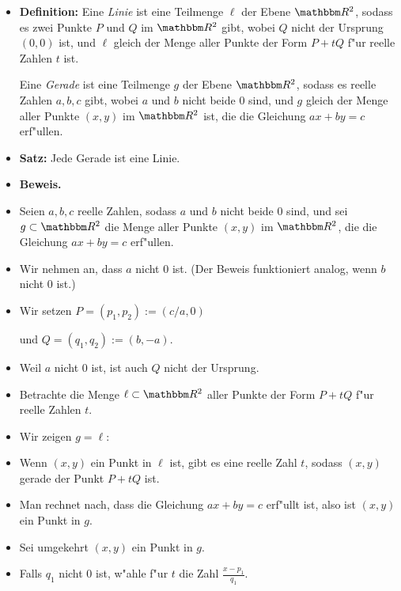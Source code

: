 \documentclass[a4paper%
]{report}
\begin{document}
\newpage

\begin{itemize}[\mbox{}]
\item {\bfseries Definition:} Eine \emph{Linie} ist eine Teilmenge
  $\ell$ der Ebene $\R^2$, sodass es zwei Punkte $P$ und $Q$ im $\R^2$
  gibt, wobei $Q$ nicht der Ursprung $(0,0)$ ist, und $\ell$ gleich
  der Menge aller Punkte der Form $P+t Q$ f"ur reelle Zahlen $t$ ist.
  \medskip

  Eine \emph{Gerade} ist eine Teilmenge $g$ der Ebene $\R^2$, sodass
  es reelle Zahlen $a,b,c$ gibt, wobei $a$ und $b$ nicht beide $0$
  sind, und $g$ gleich der Menge aller Punkte $(x,y)$ im $\R^2$ ist,
  die die Gleichung $ax+by=c$ erf"ullen.
\item {\bfseries Satz:} Jede Gerade ist eine Linie.
\item {\bfseries Beweis.}
\item Seien $a,b,c$ reelle Zahlen, sodass $a$ und $b$ nicht beide $0$
  sind, und sei $g \subset \R^2$ die Menge aller Punkte $(x,y)$ im
  $\R^2$, die die Gleichung $ax+by=c$ erf"ullen.
\item Wir nehmen an, dass $a$ nicht $0$ ist. (Der Beweis funktioniert
  analog, wenn $b$ nicht $0$ ist.)
\item Wir setzen $P=(p_{1},p_{2}):=(c/a,0)$

  und $Q=(q_{1},q_{2}):=(b,-a)$.
\item Weil $a$ nicht $0$ ist, ist auch $Q$ nicht der Ursprung.
\item Betrachte die Menge $\ell \subset \R^2$ aller Punkte der Form
  $P+tQ$ f"ur reelle Zahlen $t$.
\item Wir zeigen $g=\ell$:
\item Wenn $(x,y)$ ein Punkt in $\ell$ ist, gibt es eine reelle Zahl
  $t$, sodass $(x,y)$ gerade der Punkt $P+tQ$ ist.
\item Man rechnet nach, dass die Gleichung $ax+by=c$ erf"ullt ist,
  also ist $(x,y)$ ein Punkt in $g$.
\item Sei umgekehrt $(x,y)$ ein Punkt in $g$.
\item Falls $q_1$ nicht $0$ ist, w"ahle f"ur $t$ die Zahl
  $\displaystyle \frac{x-p_1}{q_1}$.
  

\end{itemize}
\end{document}
